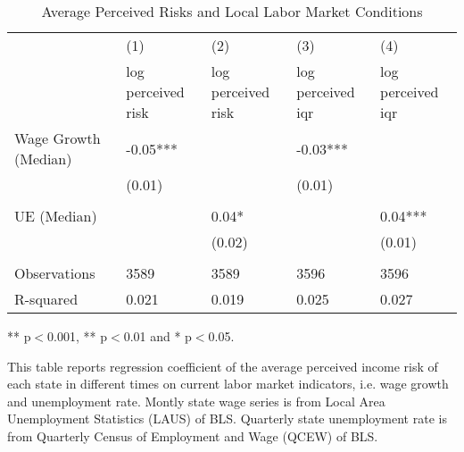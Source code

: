 	
	\begin{table}[ht]
		\centering
		\begin{adjustbox}{width=0.9\textwidth}
			\begin{threeparttable}
			\caption{Average Perceived Risks and Local Labor Market Conditions}
			\label{macro_corr_he_state}
			\begin{tabular}{lllll}
					\hline 
				& (1)                & (2)                & (3)               & (4)               \\
				& log perceived risk & log perceived risk & log perceived iqr & log perceived iqr \\
				\hline 
				Wage Growth (Median) & -0.05***           &                    & -0.03***          &                   \\
				& (0.01)             &                    & (0.01)            &                   \\
				&                    &                    &                   &                   \\
				UE (Median)          &                    & 0.04*              &                   & 0.04***           \\
				&                    & (0.02)             &                   & (0.01)            \\
				&                    &                    &                   &                   \\
					\hline 
				Observations         & 3589               & 3589               & 3596              & 3596              \\
				R-squared            & 0.021              & 0.019              & 0.025             & 0.027             \\
				\hline      
			\end{tabular}

				\begin{flushleft}
					\item *** p$<$0.001, ** p$<$0.01 and * p$<$0.05.
					\item This table reports regression coefficient of the average perceived income risk of each state in different times on current labor market indicators, i.e. wage growth and unemployment rate. Montly state wage series is from Local Area Unemployment Statistics (LAUS) of BLS. Quarterly state unemployment rate is from Quarterly Census of Employment and Wage (QCEW) of BLS. 
				\end{flushleft}
			\end{threeparttable}
		\end{adjustbox}
	\end{table}


